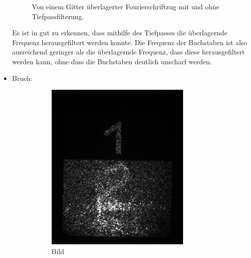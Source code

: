 \documentclass[
	a4paper,
	12pt,
	pagesize,
	ngerman
]{scrartcl}
\begin{document}
\begin{itemize}
\begin{figure}[H]
	        \caption%
	        {
					Von einem Gitter überlagerter Fourierschriftzug mit und ohne Tiefpassfilterung.
					}
	        \label{fig_4_fourier}
	    \end{figure}
	Es ist in  gut zu erkennen, dass mithilfe des Tiefpasses die überlagernde Frequenz herausgefiltert werden konnte.
	Die Frequenz der Buchstaben ist also ausreichend geringer als die überlagernde Frequenz, dass diese herausgefiltert werden kann, ohne dass die Buchstaben deutlich unscharf werden.
	\item{Bruch:}
	\begin{figure}[H]
        \centering
        \begin{subfigure}[b]{0.475\textwidth}
            \centering
            \includegraphics[width=\textwidth]{raw/4/4_halb_gitter}
            \caption%
            {Bild}
            \label{fig_4_halb_gitter}
        \end{subfigure}
        \hfill
        \begin{subfigure}[b]{0.475\textwidth}
            \centering

\end{subfigure}
\end{figure}
\end{itemize}
\end{document}
